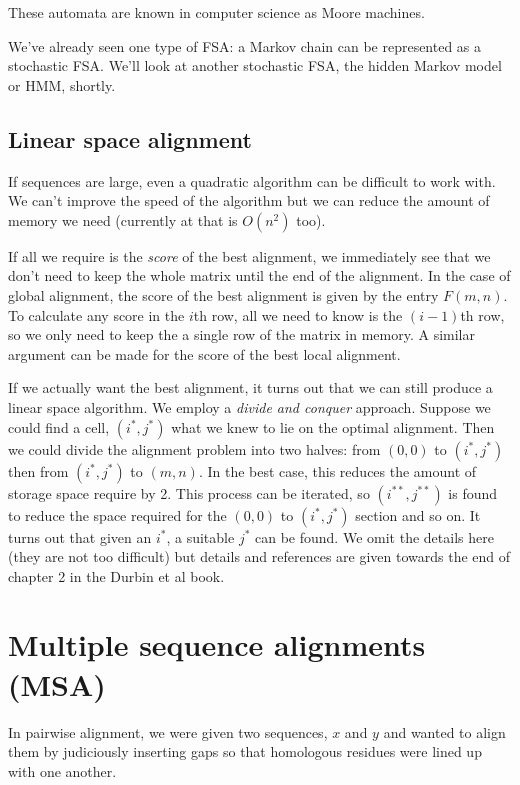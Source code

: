\documentclass[11pt]{article}
\begin{document}
 
 These automata are known in computer science as Moore machines.
 
 We've already seen one type of FSA: a Markov chain can be represented as a stochastic FSA.  We'll look at another stochastic FSA, the hidden Markov model or HMM, shortly.

\subsection{Linear space alignment}

If sequences are large, even a quadratic algorithm can be difficult to work with.  We can't improve the speed of the algorithm but we can reduce the amount of memory we need (currently at that is $O(n^2)$ too).

If all we require is the {\em score} of the best alignment, we immediately see that we don't need to keep the whole matrix until the end of the alignment.  In the case of global alignment, the score of the best alignment is given by the entry $F(m,n)$.  To calculate any score in the $i$th row, all we need to know is the $(i-1)$th row, so we only need to keep the a single row of the matrix in memory.  A similar argument can be made for the score of the best local alignment.

If we actually want the best alignment, it turns out that we can still produce a linear space algorithm.  We employ  a {\em divide and conquer} approach.  Suppose we could find a cell, $(i^\ast,j^\ast)$ what we knew to lie on the optimal alignment.  Then we could divide the alignment problem into two halves: from $(0,0)$ to $(i^\ast,j^\ast)$ then from $(i^\ast,j^\ast)$ to $(m,n)$.  In the best case, this reduces the amount of storage space require by 2.  This process can be iterated, so  $(i^{\ast \ast},j^{\ast \ast})$ is found to reduce the space required for the $(0,0)$ to $(i^\ast,j^\ast)$ section and so on.   It turns out that given an $i^\ast$, a suitable $j^\ast$ can be found.   We omit the details here (they are not too difficult) but  details and references are given towards the end of chapter 2 in the Durbin et al book.


\section{Multiple sequence alignments (MSA)}

In pairwise alignment, we were given two sequences, $x$ and $y$ and wanted to align them by judiciously inserting gaps so that homologous residues were lined up with one another.  
\end{document}
